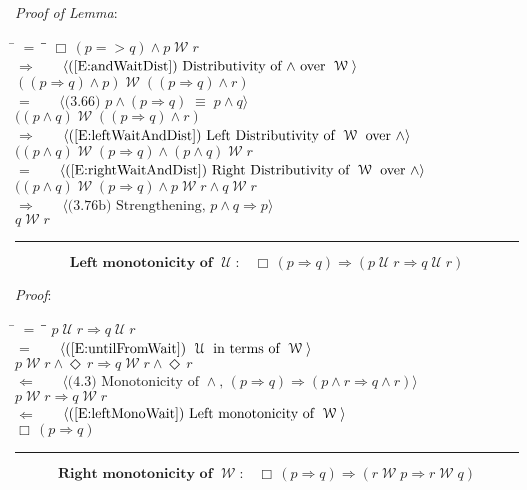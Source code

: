 \documentclass[12pt, fleqn, leqno]{article}
\newcommand{\lgap}{2pt}                             %
\newcommand{\mymathindent}{24pt}                    %
\newcommand{\equivs}{\ensuremath{\;\equiv\;}}       %
\newcommand{\impl}{\ensuremath{\Rightarrow}}        %
\newcommand{\foll}{\ensuremath{\Leftarrow}}         %
\newcommand{\Until}{\;\mathcal{U}\;}
\newcommand{\Wait}{\;\mathcal{W}\;}
\newcommand{\Event}{\Diamond\,}
\newcommand{\Always}{\Box\,}
\newcommand{\myqed}{\rule[-.23ex]{1.2ex}{2.0ex}}
\newcommand{\myqedtab}{\hspace{384pt}}              %
\newcommand{\Gll} {\langle}                         %
\newcommand{\Ggg} {\rangle}                         %
\newcommand{\Hint}[1]     {\ \ \ $\Gll              \mbox{#1} \Ggg$ }   %
\begin{document}
\emph{Proof of Lemma}:
\begin{tabbing}
\hspace{\mymathindent} \= $= \;$ \= \myqedtab \= \kill
  \> \>   $\Always (p => q) \land p \Wait r$\\[\lgap]
  \> $\impl$  \>  \Hint{(\ref{E:andWaitDist}) Distributivity of $\land$ over $\Wait$}\\[\lgap]
  \> \>   $((p \impl q) \land p) \Wait ((p \impl q) \land r)$\\[\lgap]
  \> $=$  \>  \Hint{(3.66) $p\land (p \impl q) \equivs  p \land q$}\\[\lgap]
  \> \>   $((p \land q) \Wait ((p \impl q) \land r)$\\[\lgap]
  \> $\impl$  \>  \Hint{(\ref{E:leftWaitAndDist}) Left Distributivity of $\Wait$ over $\land$}\\[\lgap]
  \> \>   $((p \land q) \Wait (p \impl q) \land (p \land q) \Wait r$\\[\lgap]
  \> $=$  \>  \Hint{(\ref{E:rightWaitAndDist}) Right Distributivity of $\Wait$ over $\land$}\\[\lgap]
  \> \>   $((p \land q) \Wait (p \impl q) \land p \Wait r \land q \Wait r$\\[\lgap]
  \> $\impl$ \> \Hint{(3.76b) Strengthening, $p\land q \impl p$} \\[\lgap]
  \> \>   $q \Wait r$ \quad \myqed
\end{tabbing}
\begin{equation}\label{E:leftMonoUntil}
\textbf{Left monotonicity of $\Until$:}\quad \Always (p \impl q) \impl (p \Until r \impl q \Until r)
\end{equation}

\emph{Proof}:
\begin{tabbing}
\hspace{\mymathindent} \= $= \;$ \= \myqedtab \= \kill
  \> \>   $p \Until r \impl q \Until r$\\[\lgap]
  \> $=$ \> \Hint{(\ref{E:untilFromWait}) $\Until$ in terms of $\Wait$} \\[\lgap]
  \> \>   $p \Wait r \land \Event r\impl q \Wait r \land \Event r$\\[\lgap]
  \> $\foll$  \>  \Hint{(4.3) Monotonicity of $\land$, $(p\impl q)\impl (p\land r \impl q\land r)$}\\[\lgap]
  \> \>   $p \Wait r \impl q \Wait r$\\[\lgap]
  \> $\foll$  \>  \Hint{(\ref{E:leftMonoWait}) Left monotonicity of $\Wait$}\\[\lgap]
  \> \>   $\Always (p \impl q)$ \quad \myqed
\end{tabbing}
\begin{equation}\label{E:rightMonoWait}
\textbf{Right monotonicity of $\Wait$:}\quad \Always (p \impl q) \impl (r \Wait p \impl r \Wait q)
\end{equation}
\end{document}
